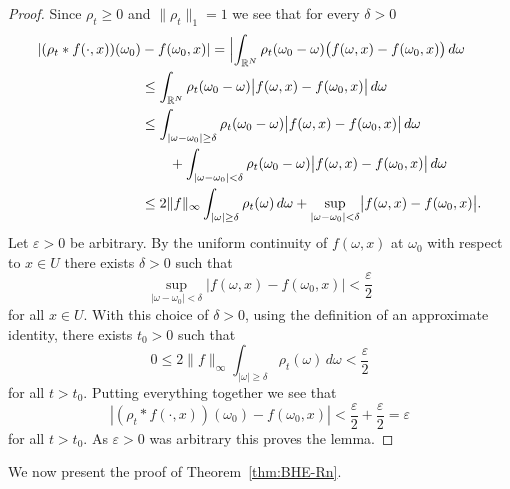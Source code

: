 \documentclass[a4paper, reqno]{amsart}
\numberwithin{equation}{section}
\theoremstyle{plain}
\theoremstyle{definition}
\theoremstyle{remark}
\newcommand{\RR}{\mathbb{R}}
\begin{document}
\begin{proof}
  Since $\rho_t\geq 0$ and $\|\rho_t\|_1=1$ we see that for every $\delta>0$
  \begin{equation*}
    \begin{split}
      |(\rho_t * f(\cdot,x))(\omega_0)&-f(\omega_0,x)|
      =\Bigl|\int_{\RR^N}\rho_t(\omega_0-\omega)\bigl(f(\omega,x)-f(\omega_0,x)\bigr)\,d\omega\\
      &\leq\int_{\RR^N}\rho_t(\omega_0-\omega)\bigl|f(\omega,x)-f(\omega_0,x)\bigr|\,d\omega\\
      &\leq\int_{|\omega-\omega_0|\geq\delta}\rho_t(\omega_0-\omega)\bigl|f(\omega,x)-f(\omega_0,x)\bigr|\,d\omega\\
      &\qquad+\int_{|\omega-\omega_0|<\delta}\rho_t(\omega_0-\omega)\bigl|f(\omega,x)-f(\omega_0,x)\bigr|\,d\omega\\
      &\leq 2\|f\|_\infty\int_{|\omega|\geq\delta}\rho_t(\omega)\,d\omega
      +\sup_{|\omega-\omega_0|<\delta}\bigl|f(\omega,x)-f(\omega_0,x)\bigr|.
    \end{split}
  \end{equation*}
  Let $\varepsilon>0$ be arbitrary. By the uniform continuity of $f(\omega,x)$ at $\omega_0$ with respect to $x\in U$ there exists $\delta>0$ such that
  \begin{equation*}
    \sup_{|\omega-\omega_0|<\delta}\bigl|f(\omega,x)-f(\omega_0,x)\bigr|<\frac{\varepsilon}{2}
  \end{equation*}
  for all $x\in U$. With this choice of $\delta>0$, using the definition of an approximate identity, there exists $t_0>0$ such that
  \begin{equation*}
    0\leq  2\|f\|_\infty\int_{|\omega|\geq\delta}\rho_t(\omega)\,d\omega<\frac{\varepsilon}{2}
  \end{equation*}
  for all $t>t_0$.  Putting everything together we see that
  \begin{equation*}
    |(\rho_t * f(\cdot,x))(\omega_0)-f(\omega_0,x)|
    <\frac{\varepsilon}{2}+\frac{\varepsilon}{2}
    =\varepsilon
  \end{equation*}
  for all $t>t_0$. As $\varepsilon>0$ was arbitrary this proves the lemma.
\end{proof}

We now present the proof of Theorem~\ref{thm:BHE-Rn}.
\end{document}
